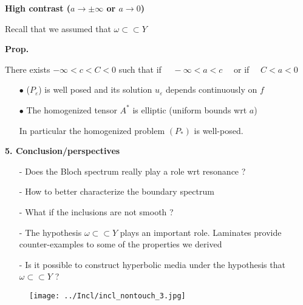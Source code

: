 \documentclass[mathserif,9pt]{beamer}
\def\e{{\varepsilon}}
\begin{document}
\begin{frame}
\small{

\textcolor{ox}{\bf{\Large High contrast ($a \to \pm \infty$ or $a \to 0$)}}
\vspace*{10mm}

Recall that we assumed that $\omega \subset\subset Y$
\medskip

{\bf Prop.} 

There exists $-\infty < c < C < 0$ such that
if $\quad -\infty < a < c \quad$ or if $\quad C < a < 0$
\medskip

\begin{itemize}
\item[\textcolor{b_bruz}{$\bullet$}]
($P_\e$) is well posed and its solution $u_\e$ depends continuously on $f$
\medskip

\item[\textcolor{b_bruz}{$\bullet$}]
The homogenized tensor $A^*$ is elliptic (uniform bounds
wrt $a$)
\medskip

In particular the homogenized problem $(P_*)$ is well-posed.
\end{itemize}

}
\end{frame}
\begin{frame}
\small{

\textcolor{b_bruz}{\bf{\Large 5. Conclusion/perspectives}}
\vspace*{10mm}

\begin{itemize}
\item[-]
Does the Bloch spectrum really play a role wrt resonance ?
\medskip

\item[-]
How to better characterize the boundary spectrum
\medskip

\item[-]
What if the inclusions are not smooth ?
\medskip

\item[-]
The hypothesis $\omega \subset\subset Y$ plays an important 
role. Laminates provide counter-examples to some of the properties
we derived
\medskip

\item[-]
Is it possible to construct hyperbolic media under the
hypothesis that $\omega \subset\subset Y$ ?
\end{itemize}

}
\end{frame}
\begin{frame}
\small{

\begin{figure}[hbt]
\hfill
\texttt{[image: ../Incl/incl\_nontouch\_3.jpg]}
\end{figure}
\vspace*{-2cm}


}
\end{frame}


\end{document}
